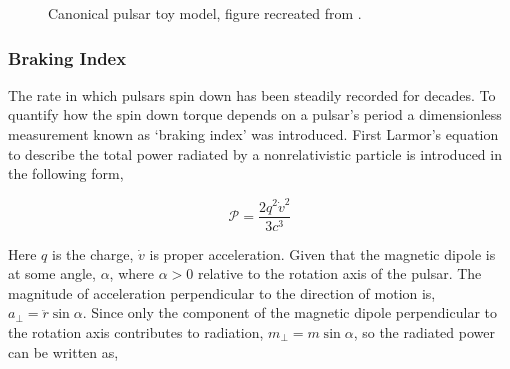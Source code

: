 \begin{figure}


    \caption[Canonical pulsar toy model]{Canonical pulsar toy model, figure recreated from \cite{pulsar_handbook}.}
    \label{fig:pulsartoymodel}
\end{figure}





\subsubsection{Braking Index}

The rate in which pulsars spin down has been steadily recorded for decades. To quantify how the spin down torque depends on a pulsar's period a dimensionless measurement known as `braking index' was introduced. First Larmor's equation to describe the total power radiated by a nonrelativistic particle is introduced in the following form, 

\begin{equation}
    \mathcal{P} = \frac{2q^2\dot v^2}{3c^3}
    \label{eq:LarmourFormula}
\end{equation}

Here $q$ is the charge, $\dot v$ is proper acceleration. Given that the magnetic dipole is at some angle, $\alpha$, where $\alpha >0$ relative to the rotation axis of the pulsar. The magnitude of acceleration perpendicular to the direction of motion is, $a_\perp = \ddot r \sin \alpha$. 
Since only the component of the magnetic dipole perpendicular to the rotation axis contributes to radiation, $m_\perp = m\sin\alpha$, so the radiated power can be written as, 

